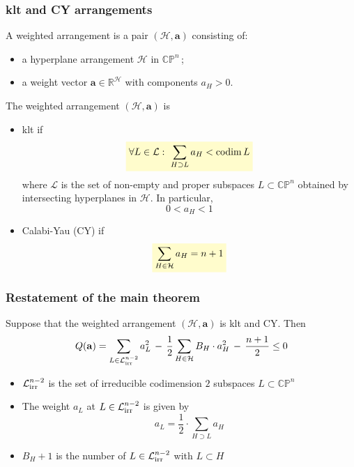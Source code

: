 \documentclass{beamer}
\newcommand{\R}{\mathbb{R}}
\newcommand{\CP}{\mathbb{CP}}
\newcommand{\mH}{\mathcal{H}}
\newcommand{\mL}{\mathcal{L}}
\newcommand{\ba}{\mathbf{a}}
\newcommand{\mLi}{\mathcal{L}_{\textup{irr}}}
\DeclareMathOperator{\codim}{codim}
\newcommand{\mathcolorbox}[2]{\colorbox{#1}{$\displaystyle #2$}}
\begin{document}
\begin{frame}
	\frametitle{klt and CY arrangements}
	A weighted arrangement is a pair \((\mH, \ba)\) consisting of:
	\begin{itemize}
		\item a hyperplane arrangement \(\mH\) in \(\CP^n\)\,;
		\item a weight vector \(\ba \in \R^{\mH}\) with components \(a_H > 0\).
	\end{itemize}
	
	
	
	
	The weighted arrangement \((\mH, \ba)\) is
	\begin{itemize}
		\item  klt if
		\[
		\mathcolorbox{yellow!20}{
	\forall L \in \mL: \,\, \sum_{H \supset L} a_H < \codim L 	
	}
		\] 
		where \(\mL\) is the set of non-empty and proper subspaces \(L \subset \CP^n\) obtained by intersecting hyperplanes in \(\mH\).
		In particular, 
		\[0 < a_H < 1 \]
		\item  Calabi-Yau (CY) if
		\[
		\mathcolorbox{yellow!20}{
			\sum_{H \in \mH} a_H = n+1 	
		}
		\] 
	\end{itemize}
\end{frame}


\begin{frame}
	\frametitle{Restatement of the main theorem}
	\begin{theorem}
		Suppose that the weighted arrangement \((\mH, \ba)\) is klt and CY. Then
		\[
		Q(\ba) = \sum_{L \in \mLi^{n-2}} a_L^2 \,-\, \frac{1}{2} \sum_{H \in \mH} B_H \cdot a_H^2 \,-\, \frac{n+1}{2} \leq 0 
		\]
	\end{theorem}
\begin{itemize}
	\item \(\mLi^{n-2}\) is the set of irreducible codimension \(2\) subspaces \(L \subset \CP^n\)
	\item The weight \(a_L\) at \(L \in \mLi^{n-2}\) is given by
	\[
	a_L = \frac{1}{2} \cdot \sum_{H \supset L} a_H
	\]
	\item \(B_H + 1\) is the number of \(L \in \mLi^{n-2}\) with \(L \subset H\)
\end{itemize}
\end{frame}
\end{document}
